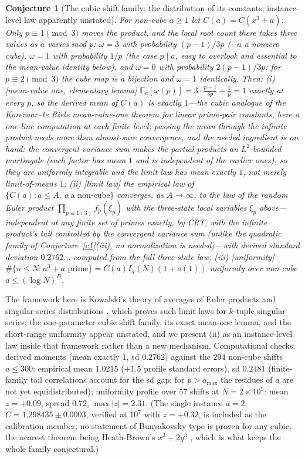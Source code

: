 \documentclass[11pt]{article}
\newtheorem{conjecture}{Conjecture}
\theoremstyle{definition}
\begin{document}
\setcounter{conjecture}{14}%
\begin{conjecture}[The cubic shift family: the distribution of its
constants; instance-level law apparently unstated]\label{c2}
For non-cube $a\ge1$ let $C(a)=C(x^3+a)$.  Only $p\equiv1\pmod3$
moves the product, and the local root count there takes \emph{three}
values as $a$ varies mod $p$:
$\omega=3$ with probability $(p-1)/3p$ ($-a$ a nonzero cube),
$\omega=1$ with probability $1/p$ (the case $p\mid a$, easy to
overlook and essential to the mean-value identity below), and
$\omega=0$ with probability
$2(p-1)/3p$; for $p\equiv2\pmod 3$ the cube map is a bijection and
$\omega=1$ identically.  Then:
\emph{(i)} [mean-value one, elementary lemma]
$\mathbb E_a[\omega(p)]=3\cdot\frac{p-1}{3p}+\frac1p=1$ exactly at
every $p$, so the derived mean of $C(a)$ is exactly $1$---the cubic
analogue of the Korevaar--te Riele mean-value-one theorem for linear
prime-pair constants, here a one-line computation
at each finite level; passing the mean through the infinite product
needs more than almost-sure convergence, and the needed ingredient is
on hand: the convergent
variance sum makes the partial products an $L^2$-bounded martingale
(each factor has mean $1$ and is independent of the earlier ones),
so they are uniformly integrable and the limit law has mean exactly
$1$, not merely limit-of-means $1$;
\emph{(ii)} [limit law] the empirical law of $\{C(a):a\le A,\ a\ \text{a non-cube}\}$ converges, as $A\to\infty$, to the law of the random Euler product
$\prod_{p\equiv1(3)}f_p(\xi_p)$ with the three-state local variables
$\xi_p$ above---independent at any finite set of primes exactly, by
CRT, with the infinite product's tail controlled by the convergent
variance sum (unlike the quadratic family of
Conjecture~\ref{c1}(iii), no normalization is needed)---with derived
standard deviation $0.2762\ldots$ computed from the full three-state
law;
\emph{(iii)} [uniformity] $\#\{n\le N: n^3+a \text{ prime}\}
=C(a)I_a(N)(1+o(1))$ uniformly over non-cube $a\le(\log N)^B$.
\end{conjecture}

The framework here is Kowalski's theory of averages of Euler products
and singular-series distributions \cite{Kowalski}, which proves such
limit laws for $k$-tuple singular series; the one-parameter cubic
shift family, its exact mean-one lemma, and the short-range
uniformity appear unstated, and we present (ii) as an
instance-level law inside that framework rather than a new mechanism.
Computational checks: derived moments (mean exactly $1$, sd $0.2762$)
against the $294$ non-cube shifts $a\le300$: empirical mean $1.0215$
($+1.5$ profile standard errors), sd $0.2481$ (finite-family tail
correlations account for the sd gap: for $p>a_{\max}$ the residues of
$a$ are not yet equidistributed); uniformity profile over $57$ shifts
at $N=2\times10^5$: mean $z=+0.09$, spread $0.72$, $\max|z|=2.31$.
(The single instance $a=2$, $C=1.298435\pm0.0003$, verified at $10^7$
with $z=+0.32$, is included as the calibration member; no statement
of Bunyakovsky type is proven for any cubic, the nearest theorem
being Heath-Brown's $x^3+2y^3$ \cite{HB}, which is what keeps the
whole family conjectural.)
\end{document}
